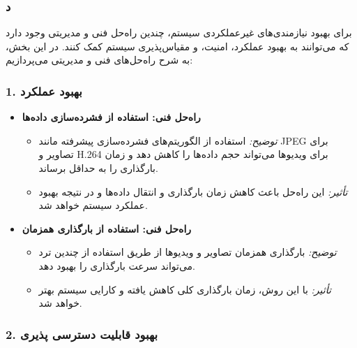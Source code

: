 \subsubsection*{د}

برای بهبود نیازمندی‌های غیرعملکردی سیستم، چندین راه‌حل فنی و مدیریتی وجود دارد که می‌توانند به بهبود عملکرد، امنیت، و مقیاس‌پذیری سیستم کمک کنند. در این بخش، به شرح راه‌حل‌های فنی و مدیریتی می‌پردازیم:

\subsubsection*{1. بهبود عملکرد}

\begin{itemize}
    \item \textbf{راه‌حل فنی: استفاده از فشرده‌سازی داده‌ها}
    \begin{itemize}
        \item \textit{توضیح:} استفاده از الگوریتم‌های فشرده‌سازی پیشرفته مانند JPEG برای تصاویر و H.264 برای ویدیوها می‌تواند حجم داده‌ها را کاهش دهد و زمان بارگذاری را به حداقل برساند.
        \item \textit{تأثیر:} این راه‌حل باعث کاهش زمان بارگذاری و انتقال داده‌ها و در نتیجه بهبود عملکرد سیستم خواهد شد.
    \end{itemize}
    
    \item \textbf{راه‌حل فنی: استفاده از بارگذاری همزمان}
    \begin{itemize}
        \item \textit{توضیح:} بارگذاری همزمان تصاویر و ویدیوها از طریق استفاده از چندین ترد می‌تواند سرعت بارگذاری را بهبود دهد.
        \item \textit{تأثیر:} با این روش، زمان بارگذاری کلی کاهش یافته و کارایی سیستم بهتر خواهد شد.
    \end{itemize}
\end{itemize}

\subsubsection*{2. بهبود قابلیت دسترسی پذیری}

